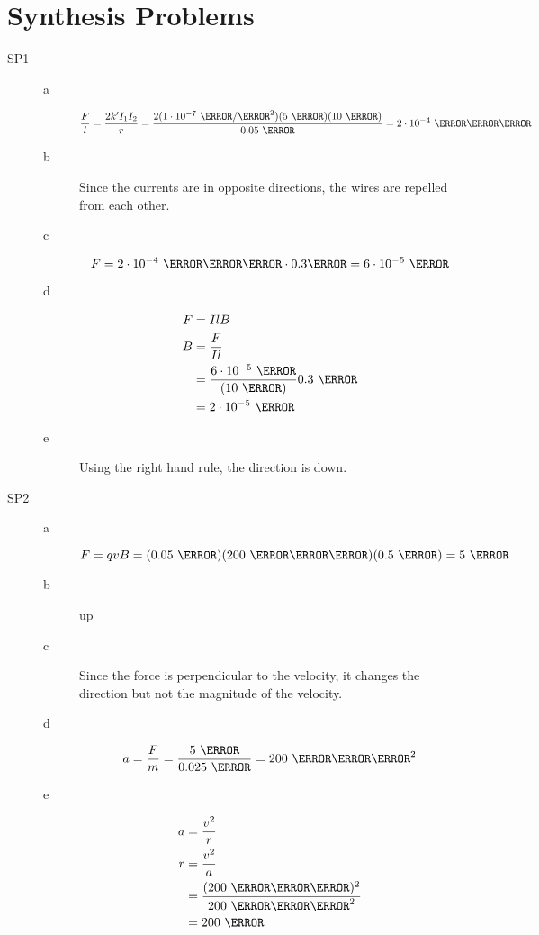 \documentclass{exam}
\begin{document}
\section{Synthesis Problems}
\begin{description}

\item[SP1]
\begin{description}

\item[a]
\[
   \frac{F}{l} = \frac{2k'I_1I_2}{r} = \frac{2 (1 \cdot 10^{-7} \ \newton/\ampere^2) (5 \ \ampere)(10 \ \ampere)}{0.05 \ \meter}
     = 2 \cdot 10^{-4} \ \newton \per \meter
\]

\item[b]
Since the currents are in opposite directions, the wires are repelled from each other.

\item[c]
\[
  F = 2 \cdot 10^{-4} \ \newton \per \meter \cdot 0.3 \meter = 6 \cdot 10^{-5} \ \newton
\]

\item[d]
\begin{align*}
  F &= IlB \\
  B &= \frac{F}{Il} \\
    &= \frac{6 \cdot 10^{-5} \ \newton}{(10 \ \ampere)}{0.3 \ \meter} \\
    &= 2 \cdot 10^{-5} \ \tesla
\end{align*}


\item[e]
Using the right hand rule, the direction is down.

\end{description}

\item[SP2]
\begin{description}

\item[a]
\[
  F = qvB = (0.05 \ \coulomb)(200 \ \meter \per \second)(0.5 \ \tesla) = 5 \ \newton
\]

\item[b]
up

\item[c]
Since the force is perpendicular to the velocity, it changes the direction but not the magnitude of the velocity.

\item[d]
\[
  a = \frac{F}{m} = \frac{5 \ \newton}{0.025 \ \kilogram} = 200 \ \meter \per \second^2
\]

\item[e]
\begin{align*}
  a &= \frac{v^2}{r} \\
  r &= \frac{v^2}{a} \\
    &= \frac{(200 \ \meter \per \second)^2}{200 \ \meter \per \second^2} \\
    &= 200 \ \meter \\
\end{align*}

\end{description}

\end{description}
\end{document}
